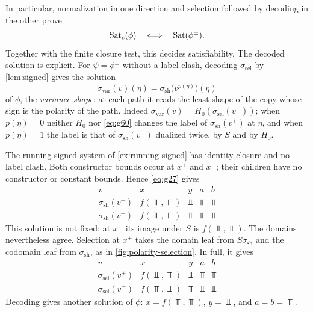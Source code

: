 In particular, normalization in one direction and selection followed by
decoding in the other prove
\begin{equation}\label{eq:g19}
 \operatorname{Sat}_c(\phi)\quad\Longleftrightarrow\quad\operatorname{Sat}(\phi^\pm).
\end{equation}
Together with the finite closure test, this decides satisfiability.
The decoded solution is explicit. For $\psi=\phi^\pm$ without a label clash,
decoding $\sigma_{\mathrm{sel}}$ by \cref{lem:signed} gives the solution
\begin{equation}\label{eq:variance-shape}
 \sigma_{\mathrm{var}}(v)(\eta)=\sigma_{\mathrm{sh}}\bigl(v^{p(\eta)}\bigr)(\eta)
\end{equation}
of $\phi$, the \emph{variance shape}: at each path it reads the least shape
of the copy whose sign is the polarity of the path. Indeed
$\sigma_{\mathrm{var}}(v)=H_0(\sigma_{\mathrm{sel}}(v^+))$; when
$p(\eta)=0$ neither $H_0$ nor \eqref{eq:g60} changes the label of
$\sigma_{\mathrm{sh}}(v^+)$ at $\eta$, and when $p(\eta)=1$ the label is that
of $\sigma_{\mathrm{sh}}(v^-)$ dualized twice, by $S$ and by $H_0$.

\begin{example}\label{ex:running-selection}
The running signed system of \cref{ex:running-signed} has identity closure
and no label clash. Both constructor bounds occur at $x^+$ and $x^-$;
their children have no constructor or constant bounds. Hence
\eqref{eq:g27} gives
\[
\begin{array}{c|cccc}
 v&x&y&a&b\\\hline
 \sigma_{\mathrm{sh}}(v^+)&f(\Top,\Top)&\Bot&\Top&\Top\\
 \sigma_{\mathrm{sh}}(v^-)&f(\Top,\Top)&\Top&\Top&\Top
\end{array}
\]
This solution is not fixed: at $x^+$ its image under $S$ is $f(\Bot,\Bot)$.
The domains nevertheless agree. Selection at $x^+$ takes the domain
leaf from $S\sigma_{\mathrm{sh}}$ and the codomain leaf from
$\sigma_{\mathrm{sh}}$, as in \cref{fig:polarity-selection}. In full, it gives
\[
\begin{array}{c|cccc}
 v&x&y&a&b\\\hline
 \sigma_{\mathrm{sel}}(v^+)&f(\Bot,\Top)&\Bot&\Top&\Top\\
 \sigma_{\mathrm{sel}}(v^-)&f(\Top,\Bot)&\Top&\Bot&\Bot
\end{array}
\]
Decoding gives another solution of $\phi$: $x=f(\Top,\Top)$,
$y=\Bot$, and $a=b=\Top$.
\end{example}

